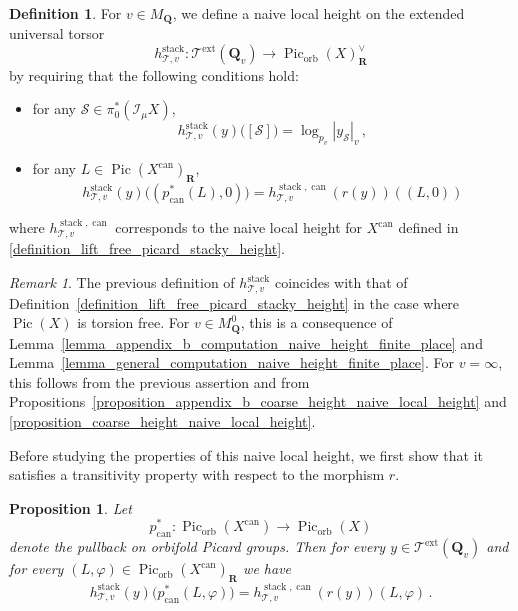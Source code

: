 \documentclass{proc-l}
\newcommand{\R}{\mathbf{R}}
\newcommand{\Q}{\mathbf{Q}}
\DeclareMathOperator{\Pic}{Pic}
\DeclareMathOperator{\can}{can}
\DeclareMathOperator{\stack}{stack}
\DeclareMathOperator{\orb}{orb}
\DeclareMathOperator{\ext}{ext}
\newcommand{\stackS}{\mathcal{S}}
\newcommand{\stackT}{\mathcal{T}}
\newcommand{\sheafI}{\mathcal{I}}
\newcommand{\twistsector}{\pi_0^*(\sheafI_{\mu} X)}
\newtheorem{prop}[theorem]{Proposition}
\theoremstyle{definition}
\newtheorem{definition}[theorem]{Definition}
\theoremstyle{remark}
\newtheorem{remark}[theorem]{Remark}
\numberwithin{equation}{section}
\begin{document}
\begin{definition}\label{definition_naive_local_height_extended_universal_torsor}
For $v \in M_{\Q}$, we define a naive local height on the extended universal torsor
\[
h_{\stackT,v}^{\stack} : \stackT^{\ext}(\Q_v) \longrightarrow \Pic_{\orb}(X)^{\vee}_{\R}
\]by requiring that the following conditions hold:
\begin{itemize}
\item
for any $\stackS \in \twistsector$,
\[
h_{\stackT,v}^{\stack}(y)\bigl([\stackS]\bigr)
=
\log_{p_v} |y_{\stackS}|_v \, ,
\]

\item
for any $L \in \Pic(X^{\can})_{\R}$,
\[
h_{\stackT,v}^{\stack}(y)\bigl((p_{\can}^*(L),0)\bigr)
=
h_{\stackT,v}^{\stack,\can}\!\left(r(y)\right)((L,0))
\]
\end{itemize}where $h_{\stackT,v}^{\stack,\can}$ corresponds to the naive local height for $X^{\can}$ defined in \ref{definition_lift_free_picard_stacky_height}.
\end{definition}

\begin{remark}
    The previous definition of $h_{\stackT,v}^{\stack}$ coincides with that of Definition~\ref{definition_lift_free_picard_stacky_height} in the case where $\Pic(X)$ is torsion free. For $v \in M_{\Q}^0$, this is a consequence of Lemma~\ref{lemma_appendix_b_computation_naive_height_finite_place} and Lemma~\ref{lemma_general_computation_naive_height_finite_place}. For $v = \infty$, this follows from the previous assertion and from Propositions~\ref{proposition_appendix_b_coarse_height_naive_local_height} and \ref{proposition_coarse_height_naive_local_height}.
\end{remark}


Before studying the properties of this naive local height, we first show that it satisfies a transitivity property with respect to the morphism $r$.

\begin{prop}\label{proposition_functoriality_naive_canonical_stack}
Let
\[
p_{\can}^* : \Pic_{\orb}(X^{\can}) \longrightarrow \Pic_{\orb}(X)
\]
denote the pullback on orbifold Picard groups. Then for every $y \in \stackT^{\ext}(\Q_v)$ and for every $(L,\varphi) \in \Pic_{\orb}(X^{\can})_{\R}$ we have
\[
h_{\stackT,v}^{\stack}(y)\bigl(p_{\can}^*(L,\varphi)\bigr)
=
h_{\stackT,v}^{\stack,\can}\!\left(r(y)\right)(L,\varphi) \, .
\]
\end{prop}
\end{document}

